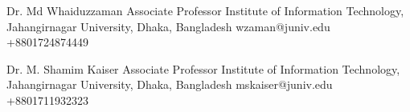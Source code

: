

\cvref
{Dr. Md Whaiduzzaman}
{Associate Professor}
{Institute of Information Technology, Jahangirnagar University, Dhaka, Bangladesh}
{wzaman@juniv.edu}
{+8801724874449}

\divider

\cvref
{Dr. M. Shamim Kaiser}
{Associate Professor}
{Institute of Information Technology, Jahangirnagar University, Dhaka, Bangladesh}
{mskaiser@juniv.edu}
{+8801711932323}

